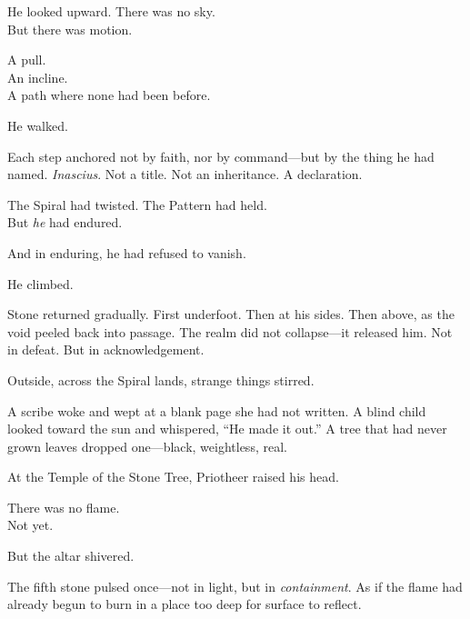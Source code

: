 \documentclass[9pt]{article}
\begin{document}
\vspace{0.5em}
He looked upward. There was no sky.\\
But there was motion.

\vspace{0.5em}
A pull.\\
An incline.\\
A path where none had been before.

\vspace{0.5em}
He walked.

\vspace{0.5em}
Each step anchored not by faith, nor by command---but by the thing he had named. \textit{Inascius}. Not a title. Not an inheritance. A declaration.

\vspace{0.5em}
The Spiral had twisted. The Pattern had held.\\
But \textit{he} had endured.

\vspace{0.5em}
And in enduring, he had refused to vanish.

\vspace{0.5em}
He climbed.

\vspace{0.5em}
Stone returned gradually. First underfoot. Then at his sides. Then above, as the void peeled back into passage. The realm did not collapse---it released him. Not in defeat. But in acknowledgement.

\vspace{0.5em}
Outside, across the Spiral lands, strange things stirred.

\vspace{0.5em}
A scribe woke and wept at a blank page she had not written. A blind child looked toward the sun and whispered, ``He made it out.'' A tree that had never grown leaves dropped one---black, weightless, real.

\vspace{0.5em}
At the Temple of the Stone Tree, Priotheer raised his head.

\vspace{0.5em}
There was no flame.\\
Not yet.

\vspace{0.5em}
But the altar shivered.

\vspace{0.5em}
The fifth stone pulsed once---not in light, but in \textit{containment}. As if the flame had already begun to burn in a place too deep for surface to reflect.
\end{document}
